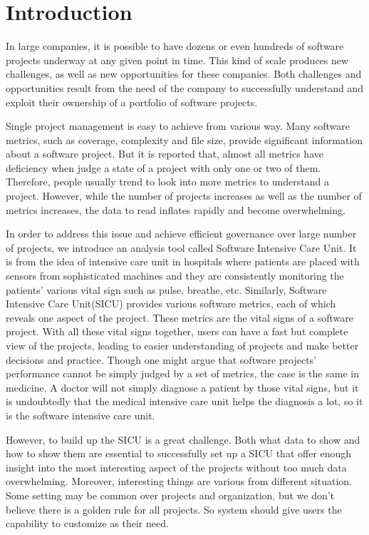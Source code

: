 
\chapter{Introduction}

In large companies, it is possible to have dozens or even hundreds of software projects underway at any given point in time. This kind of scale produces new challenges, as well as new opportunities for these companies. Both challenges and opportunities result from the need of the company to successfully understand and exploit their ownership of a portfolio of software projects. 

Single project management is easy to achieve from various way. Many software metrics, such as coverage, complexity and file size, provide significant information about a software project. But it is reported that, almost all metrics have deficiency when judge a state of a project with only one or two of them. Therefore, people usually trend to look into more metrics to understand a project. However, while the number of projects increases as well as the number of metrics increases, the data to read inflates rapidly and become overwhelming.

In order to address this issue and achieve efficient governance over large number of projects, we introduce an analysis tool called Software Intensive Care Unit. It is from the idea of intensive care unit in hospitals where patients are placed with sensors from sophisticated machines and they are consistently monitoring the patients' various vital sign such as pulse, breathe, etc. Similarly, Software Intensive Care Unit(SICU) provides various software metrics, each of which reveals one aspect of the project. These metrics are the vital signs of a software project. With all these vital signs together, users can have a fast but complete view of the projects, leading to easier understanding of projects and make better decisions and practice. Though one might argue that software projects' performance cannot be simply judged by a set of metrics, the case is the same in medicine. A doctor will not simply diagnose a patient by those vital signs, but it is undoubtedly that the medical intensive care unit helps the diagnosis a lot, so it is the software intensive care unit.

However, to build up the SICU is a great challenge. Both what data to show and how to show them are essential to successfully set up a SICU that offer enough insight into the most interesting aspect of the projects without too much data overwhelming. Moreover, interesting things are various from different situation. Some setting may be common over projects and organization, but we don't believe there is a golden rule for all projects. So system should give users the capability to customize as their need.

